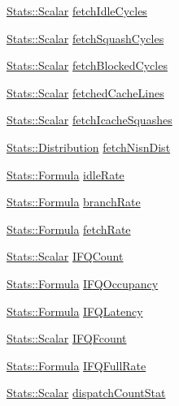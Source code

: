 \begin{DoxyCompactItemize}
\item 
\hyperlink{classStats_1_1Scalar}{Stats::Scalar} \hyperlink{classFrontEnd_a8af716ad2a53a409640347226078591c}{fetchIdleCycles}
\item 
\hyperlink{classStats_1_1Scalar}{Stats::Scalar} \hyperlink{classFrontEnd_ae1b92a3469ac6b00fddd788b71f64c9a}{fetchSquashCycles}
\item 
\hyperlink{classStats_1_1Scalar}{Stats::Scalar} \hyperlink{classFrontEnd_a0501ffad4abed98618a6cf0ba9c3599b}{fetchBlockedCycles}
\item 
\hyperlink{classStats_1_1Scalar}{Stats::Scalar} \hyperlink{classFrontEnd_a0ead660daa133edcd64ac552d473ebba}{fetchedCacheLines}
\item 
\hyperlink{classStats_1_1Scalar}{Stats::Scalar} \hyperlink{classFrontEnd_af5ce6113f31fddaab758b8fb025600bc}{fetchIcacheSquashes}
\item 
\hyperlink{classStats_1_1Distribution}{Stats::Distribution} \hyperlink{classFrontEnd_a4793a4a8857c13e7812b1c37c6df761b}{fetchNisnDist}
\item 
\hyperlink{classStats_1_1Formula}{Stats::Formula} \hyperlink{classFrontEnd_a4b942e4ec6b8c1d29a1c96e901ea71dd}{idleRate}
\item 
\hyperlink{classStats_1_1Formula}{Stats::Formula} \hyperlink{classFrontEnd_abceba4006d416e352df47f692b589bc3}{branchRate}
\item 
\hyperlink{classStats_1_1Formula}{Stats::Formula} \hyperlink{classFrontEnd_a7656c6cac3b62fa389148c650a5d127a}{fetchRate}
\item 
\hyperlink{classStats_1_1Scalar}{Stats::Scalar} \hyperlink{classFrontEnd_af5442c563401e6561dbceb43f73edef5}{IFQCount}
\item 
\hyperlink{classStats_1_1Formula}{Stats::Formula} \hyperlink{classFrontEnd_a0cf052f31902edea9904fb44946d8add}{IFQOccupancy}
\item 
\hyperlink{classStats_1_1Formula}{Stats::Formula} \hyperlink{classFrontEnd_a4204358ee6bfe3c054b44863d0357534}{IFQLatency}
\item 
\hyperlink{classStats_1_1Scalar}{Stats::Scalar} \hyperlink{classFrontEnd_abb5d3a8be34487bf58c34aa0a95c5546}{IFQFcount}
\item 
\hyperlink{classStats_1_1Formula}{Stats::Formula} \hyperlink{classFrontEnd_a5e1f7150d45f7f01173be5aaec45e5b1}{IFQFullRate}
\item 
\hyperlink{classStats_1_1Scalar}{Stats::Scalar} \hyperlink{classFrontEnd_aeaaccfce2b14dfd27899536343487787}{dispatchCountStat}
\item 

\end{DoxyCompactItemize}
